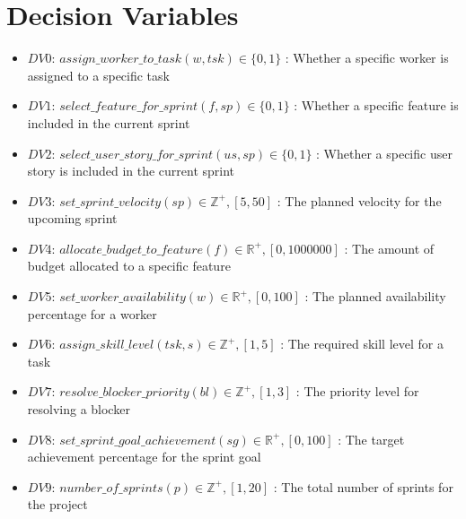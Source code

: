 \documentclass[11pt]{article}
\begin{document}
\section{Decision Variables}
\begin{itemize}
    \item $DV0$: $assign\_worker\_to\_task(w, tsk) \in \{0, 1\}$ : Whether a specific worker is assigned to a specific task
    \item $DV1$: $select\_feature\_for\_sprint(f, sp) \in \{0, 1\}$ : Whether a specific feature is included in the current sprint
    \item $DV2$: $select\_user\_story\_for\_sprint(us, sp) \in \{0, 1\}$ : Whether a specific user story is included in the current sprint
    \item $DV3$: $set\_sprint\_velocity(sp) \in \mathbb{Z}^{+}, [5, 50]$ : The planned velocity for the upcoming sprint
    \item $DV4$: $allocate\_budget\_to\_feature(f) \in \mathbb{R}^{+}, [0, 1000000]$ : The amount of budget allocated to a specific feature
    \item $DV5$: $set\_worker\_availability(w) \in \mathbb{R}^{+}, [0, 100]$ : The planned availability percentage for a worker
    \item $DV6$: $assign\_skill\_level(tsk, s) \in \mathbb{Z}^{+}, [1, 5]$ : The required skill level for a task
    \item $DV7$: $resolve\_blocker\_priority(bl) \in \mathbb{Z}^{+}, [1, 3]$ : The priority level for resolving a blocker
    \item $DV8$: $set\_sprint\_goal\_achievement(sg) \in \mathbb{R}^{+}, [0, 100]$ : The target achievement percentage for the sprint goal
    \item $DV9$: $number\_of\_sprints(p) \in \mathbb{Z}^{+}, [1, 20]$ : The total number of sprints for the project
\end{itemize}
\end{document}
